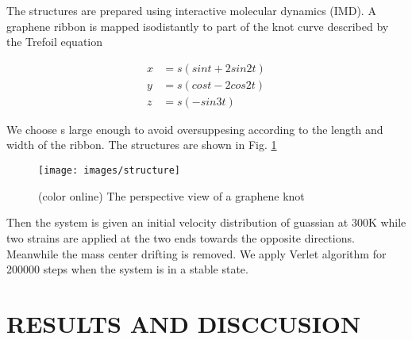 \documentclass[%
 reprint,
 amsmath,amssymb,
 aps,
prb,
]{revtex4-1}
\begin{document}
The structures are prepared using interactive molecular dynamics (IMD). A graphene ribbon is mapped isodistantly to part of the knot curve described by the Trefoil equation

\begin{equation}
  \begin{aligned}
    x & = s(sin t+2 sin 2t) \\
    y & = s(cos t-2 cos 2t) \\
    z & = s(-sin 3t)
  \end{aligned}
\end{equation}

We choose s large enough to avoid oversuppesing according to the length and width of the ribbon. The structures are shown in Fig. \ref{fig:structure}

\begin{figure}[b]
  \texttt{[image: images/structure]}
  \caption{\label{fig:structure}  (color online) The perspective view of a graphene knot}
\end{figure}

Then the system is given an initial velocity distribution of guassian at 300K while two strains are applied at the two ends towards the opposite directions. Meanwhile the mass center drifting is removed. We apply Verlet algorithm for 200000 steps when the system is in a stable state.

\section{RESULTS AND DISCCUSION}
\end{document}
